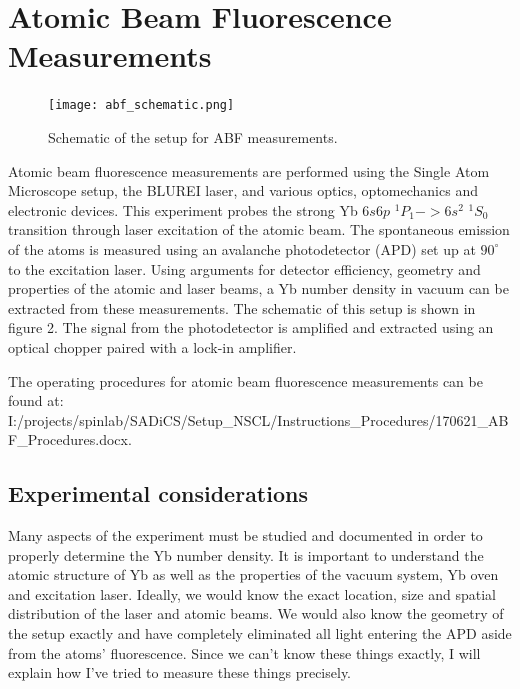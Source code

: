 \documentclass[12pt, a4paper]{article}
\begin{document}
\section{Atomic Beam Fluorescence Measurements}
\begin{figure}
\vspace*{-6mm}
  \texttt{[image: abf\_schematic.png]}
  \vspace*{-5mm}
  \caption{Schematic of the setup for ABF measurements.}
\end{figure}
Atomic beam fluorescence measurements are performed using the Single Atom Microscope setup, the BLUREI laser, and various optics, optomechanics and electronic devices. This experiment probes the strong Yb $6s6p$ $ ^{1}P_{1} -> 6s^2 $ $^{1}S_{0}$ transition through laser excitation of the atomic beam. The spontaneous emission of the atoms is measured using an avalanche photodetector (APD) set up at $90^{\circ}$ to the excitation laser. Using arguments for detector efficiency, geometry and properties of the atomic and laser beams, a Yb number density in vacuum can be extracted from these measurements. The schematic of this setup is shown in figure 2. The signal from the photodetector is amplified and extracted using an optical chopper paired with a lock-in amplifier.

The operating procedures for atomic beam fluorescence measurements can be found at: \footnotesize I:/projects/spinlab/SADiCS/Setup\_NSCL/Instructions\_Procedures/170621\_ABF\_Procedures.docx.\normalsize
 
\subsection{Experimental considerations}
Many aspects of the experiment must be studied and documented in order to properly determine the Yb number density. It is important to understand the atomic structure of Yb as well as the properties of the vacuum system, Yb oven and excitation laser. Ideally, we would know the exact location, size and spatial distribution of the laser and atomic beams. We would also know the geometry of the setup exactly and have completely eliminated all light entering the APD aside from the atoms' fluorescence. Since we can't know these things exactly, I will explain how I've tried to measure these things precisely. 
\end{document}
